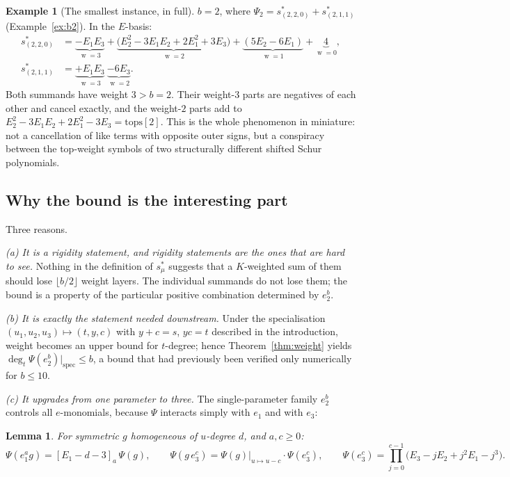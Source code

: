 \documentclass[10pt]{article}
\theoremstyle{plain}
\newtheorem{lemma}[theorem]{Lemma}
\theoremstyle{definition}
\newtheorem{example}[theorem]{Example}
\newcommand{\ffal}[2]{[#1]_{#2}}
\newcommand{\wt}{\operatorname{w}}
\begin{document}
\begin{example}[The smallest instance, in full]\label{ex:cancel}
$b=2$, where $\Psi_2=s^*_{(2,2,0)}+s^*_{(2,1,1)}$ (Example~\ref{ex:b2}). In the $E$-basis:
\begin{align*}
 s^*_{(2,2,0)}&=\underbrace{-E_1E_3}_{\wt=3}
   +\underbrace{\big(E_2^2-3E_1E_2+2E_1^2+3E_3\big)}_{\wt=2}
   +\underbrace{(5E_2-6E_1)}_{\wt=1}+\underbrace{4}_{\wt=0},\\
 s^*_{(2,1,1)}&=\underbrace{+E_1E_3}_{\wt=3}\ \underbrace{-6E_3}_{\wt=2}.
\end{align*}
Both summands have weight $3>b=2$. Their weight-$3$ parts are negatives of each other and
cancel exactly, and the weight-$2$ parts add to
$E_2^2-3E_1E_2+2E_1^2-3E_3=\mathrm{tops}[2]$. This is the whole phenomenon in miniature: not
a cancellation of like terms with opposite outer signs, but a conspiracy between the
top-weight symbols of two structurally different shifted Schur polynomials.
\end{example}

\subsection{Why the bound is the interesting part}

Three reasons.

\emph{(a) It is a rigidity statement, and rigidity statements are the ones that are hard to
see.} Nothing in the definition of $s^*_\mu$ suggests that a $K$-weighted sum of them should
lose $\lfloor b/2\rfloor$ weight layers. The individual summands do not lose them; the
bound is a property of the particular positive combination determined by $e_2^b$.

\emph{(b) It is exactly the statement needed downstream.} Under the specialisation
$(u_1,u_2,u_3)\mapsto(t,y,c)$ with $y+c=s$, $yc=t$ described in the introduction, weight
becomes an upper bound for $t$-degree; hence Theorem~\ref{thm:weight} yields
$\deg_t\Psi(e_2^b)\big|_{\mathrm{spec}}\le b$, a bound that had previously been verified
only numerically for $b\le10$.

\emph{(c) It upgrades from one parameter to three.} The single-parameter family $e_2^b$
controls all $e$-monomials, because $\Psi$ interacts simply with $e_1$ and with $e_3$:

\begin{lemma}\label{lem:shifts}
For symmetric $g$ homogeneous of $u$-degree $d$, and $a,c\ge0$:
\[
 \Psi(e_1^ag)=\ffal{E_1-d-3}{a}\,\Psi(g),\qquad
 \Psi(g\,e_3^c)=\Psi(g)\big|_{u\mapsto u-c}\cdot\Psi(e_3^c),\qquad
 \Psi(e_3^c)=\prod_{j=0}^{c-1}\big(E_3-jE_2+j^2E_1-j^3\big).
\]
\end{lemma}
\end{document}

